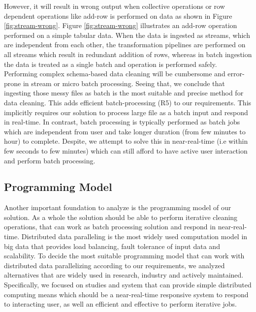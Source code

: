  However, it will result in wrong output when collective operations or row dependent operations like add-row is performed on data as shown in Figure \ref{fig:stream-wrong}. Figure \ref{fig:stream-wrong} illustrates an add-row operation performed on a simple tabular data. When the data is ingested as streams, which are independent from each other, the transformation pipelines are performed on all streams which result in redundant addition of rows, whereas in batch ingestion the data is treated as a single batch and operation is performed safely. Performing complex schema-based data cleaning will be cumbersome and error-prone in stream or micro batch processing. Seeing that, we conclude that ingesting those messy files as batch is the most suitable and precise method for data cleaning. This adds efficient batch-processing (R5) to our requirements. This implicitly requires our solution to process large file as a batch input and respond in real-time. In contrast, batch processing is typically performed as batch jobs which are independent from user \cite{beyondbatchprocessing} and take longer duration (from few minutes to hour) to complete. Despite, we attempt to solve this in near-real-time (i.e within few seconds to few minutes) which can still afford to have active user interaction and perform batch processing. 
 \subsection{Programming Model}
Another important foundation to analyze is the programming model of our solution. As a whole the solution should be able to perform iterative cleaning operations, that can work as batch processing solution and respond in near-real-time. Distributed data paralleling is the most widely used computation model in big data that provides load balancing, fault tolerance of input data \cite{Jackson2015517} and scalability. To decide the most suitable programming model that can work with distributed data parallelizing according to our requirements, we analyzed alternatives that are widely used in research, industry and actively maintained. Specifically, we focused on studies and system that can provide simple distributed computing means which should be a near-real-time responsive system to respond to interacting user, as well an efficient and effective to perform iterative jobs. 
